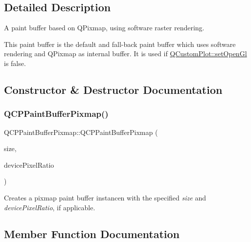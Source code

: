 \subsection{Detailed Description}
A paint buffer based on Q\+Pixmap, using software raster rendering. 

This paint buffer is the default and fall-\/back paint buffer which uses software rendering and Q\+Pixmap as internal buffer. It is used if \hyperlink{classQCustomPlot_a7db1adc09016329f3aef7c60da935789}{Q\+Custom\+Plot\+::set\+Open\+Gl} is false. 

\subsection{Constructor \& Destructor Documentation}
\mbox{\label{classQCPPaintBufferPixmap_aef0224e03b9285509391fcd61a8e6844}} 
\subsubsection{\texorpdfstring{Q\+C\+P\+Paint\+Buffer\+Pixmap()}{QCPPaintBufferPixmap()}}
{\footnotesize\ttfamily Q\+C\+P\+Paint\+Buffer\+Pixmap\+::\+Q\+C\+P\+Paint\+Buffer\+Pixmap (\begin{DoxyParamCaption}\item[{const Q\+Size \&}]{size,  }\item[{double}]{device\+Pixel\+Ratio }\end{DoxyParamCaption})\hspace{0.3cm}{\ttfamily [explicit]}}

Creates a pixmap paint buffer instancen with the specified {\itshape size} and {\itshape device\+Pixel\+Ratio}, if applicable. 

\subsection{Member Function Documentation}
\mbox{\label{classQCPPaintBufferPixmap_a14badbd010a3cde6b55817ccb7b65217}} 
